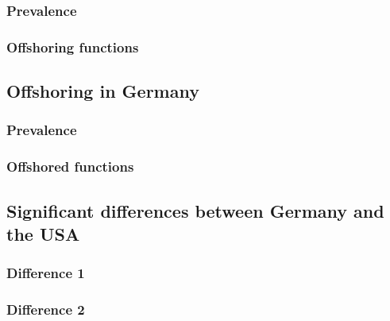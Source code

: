 \subsubsection{Prevalence}

\subsubsection{Offshoring functions}

\subsection{Offshoring in Germany}

\subsubsection{Prevalence}

\subsubsection{Offshored functions}

\subsection{Significant differences between Germany and the USA}

\subsubsection{Difference 1}

\subsubsection{Difference 2}
